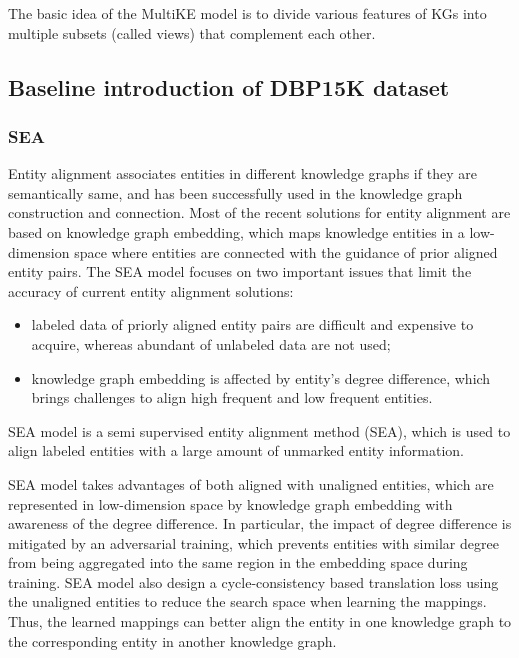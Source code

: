 \documentclass[sigconf]{acmart}
\begin{document}
{The basic idea of the MultiKE model is to divide various features of KGs into multiple subsets (called views) that complement each other.

\subsection{Baseline introduction of DBP15K dataset}

\subsubsection{SEA \cite{pei2019semi}}

Entity alignment associates entities in different knowledge graphs if they are semantically same, and has been successfully used in the knowledge graph construction and connection. Most of the recent solutions for entity alignment are based on knowledge graph embedding, which maps knowledge entities in a low-dimension space where entities are connected with the guidance of prior aligned entity pairs. The SEA model focuses on two important issues that limit the accuracy of current entity alignment solutions:
\begin{itemize}
\item labeled data of priorly aligned entity pairs are difficult and expensive to acquire, whereas abundant of unlabeled data are not used;
\item knowledge graph embedding is affected by entity’s degree difference, which brings challenges to align high frequent and low frequent entities. 
\end{itemize}

SEA model is a semi supervised entity alignment method (SEA), which is used to align labeled entities with a large amount of unmarked entity information.

SEA model takes advantages of both aligned with unaligned entities, which are represented in low-dimension space by knowledge graph embedding with awareness of the degree difference. In particular, the impact of degree difference is mitigated by an adversarial training, which prevents entities with similar degree from being aggregated into the same region in the embedding space during training. SEA model also design a cycle-consistency based translation loss using the unaligned entities to reduce the search space when learning the mappings. Thus, the learned mappings can better align the entity in one knowledge graph to the corresponding entity in another knowledge graph.

}
\end{document}
